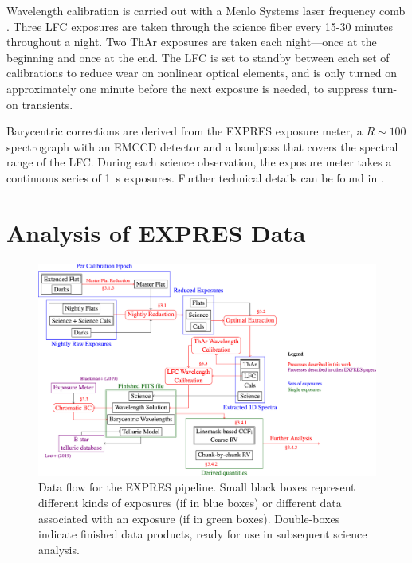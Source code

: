 Wavelength calibration is carried out with a Menlo Systems laser frequency comb \citep[LFC; similar to those in][]{steinmetz_laser_2008,probst_relative_2016}. Three LFC exposures are taken through the science fiber every 15-30 minutes throughout a night.  Two ThAr exposures are taken each night---once at the beginning and once at the end. The LFC is set to standby between each set of calibrations to reduce wear on nonlinear optical elements, and is only turned on approximately one minute before the next exposure is needed, to suppress turn-on transients.

Barycentric corrections are derived from the EXPRES exposure meter, a $R\sim100$ spectrograph with an EMCCD detector and a bandpass that covers the spectral range of the LFC. During each science observation, the exposure meter takes a continuous series of 1~\si{\second} exposures. Further technical details can be found in \citet{blackman_measured_2019}.

\section{Analysis of EXPRES Data}
\label{pipeline:analysis}

\begin{figure}
    \centering
    \includegraphics[width=\textwidth]{figures-4/pipeline.jpg}
    \caption[Data flow for the EXPRES pipeline]{Data flow for the EXPRES pipeline. Small black boxes represent different kinds of exposures (if in blue boxes) or different data associated with an exposure (if in green boxes). Double-boxes indicate finished data products, ready for use in subsequent science analysis.\label{fig:flowchart}}
\end{figure}

